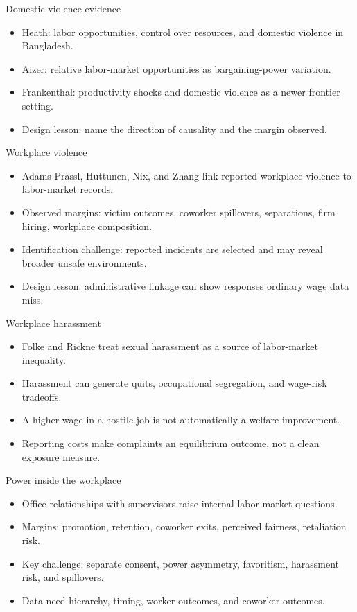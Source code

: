 \documentclass[aspectratio=169,11pt]{beamer}
\begin{document}
\begin{frame}{Domestic violence evidence}
\begin{itemize}
    \item Heath: labor opportunities, control over resources, and domestic violence in Bangladesh.
    \item Aizer: relative labor-market opportunities as bargaining-power variation.
    \item Frankenthal: productivity shocks and domestic violence as a newer frontier setting.
    \item Design lesson: name the direction of causality and the margin observed.
\end{itemize}
\end{frame}

\begin{frame}{Workplace violence}
\begin{itemize}
    \item Adams-Prassl, Huttunen, Nix, and Zhang link reported workplace violence to labor-market records.
    \item Observed margins: victim outcomes, coworker spillovers, separations, firm hiring, workplace composition.
    \item Identification challenge: reported incidents are selected and may reveal broader unsafe environments.
    \item Design lesson: administrative linkage can show responses ordinary wage data miss.
\end{itemize}
\end{frame}

\begin{frame}{Workplace harassment}
\begin{itemize}
    \item Folke and Rickne treat sexual harassment as a source of labor-market inequality.
    \item Harassment can generate quits, occupational segregation, and wage-risk tradeoffs.
    \item A higher wage in a hostile job is not automatically a welfare improvement.
    \item Reporting costs make complaints an equilibrium outcome, not a clean exposure measure.
\end{itemize}
\end{frame}

\begin{frame}{Power inside the workplace}
\begin{itemize}
    \item Office relationships with supervisors raise internal-labor-market questions.
    \item Margins: promotion, retention, coworker exits, perceived fairness, retaliation risk.
    \item Key challenge: separate consent, power asymmetry, favoritism, harassment risk, and spillovers.
    \item Data need hierarchy, timing, worker outcomes, and coworker outcomes.
\end{itemize}
\end{frame}
\end{document}

